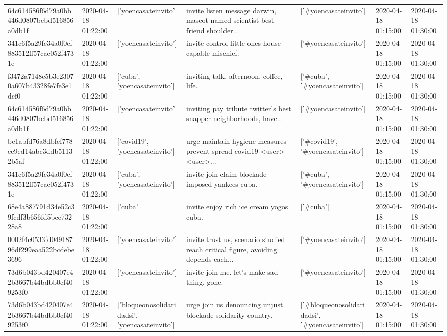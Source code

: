 \begin{tabular}{lllllll}
64c614586f6d79a0bb446d0807bebd516856a0db1f & 2020-04-18 01:22:00 & ['yoencasateinvito'] & invite listen message darwin, mascot named scientist best friend shoulder... & ['#yoencasateinvito'] & 2020-04-18 01:15:00 & 2020-04-18 01:30:00 \\
341c6f5a29fc34a0f0cf883512ff57cae052f4731e & 2020-04-18 01:22:00 & ['yoencasateinvito'] & invite control little ones house capable mischief. & ['#yoencasateinvito'] & 2020-04-18 01:15:00 & 2020-04-18 01:30:00 \\
f3472a7148c5b3e23070a607b43328fe7fe3e1dcf0 & 2020-04-18 01:22:00 & ['cuba', 'yoencasateinvito'] & inviting talk, afternoon, coffee, life. & ['#cuba', '#yoencasateinvito'] & 2020-04-18 01:15:00 & 2020-04-18 01:30:00 \\
64c614586f6d79a0bb446d0807bebd516856a0db1f & 2020-04-18 01:22:00 & ['yoencasateinvito'] & inviting pay tribute twitter's best snapper neighborhoods, have... & ['#yoencasateinvito'] & 2020-04-18 01:15:00 & 2020-04-18 01:30:00 \\
bc1abfd76a8dbfef778ee9ed14abc3ddb51132b5af & 2020-04-18 01:22:00 & ['covid19', 'yoencasateinvito'] & urge maintain hygiene measures prevent spread covid19 <user> <user>... & ['#covid19', '#yoencasateinvito'] & 2020-04-18 01:15:00 & 2020-04-18 01:30:00 \\
341c6f5a29fc34a0f0cf883512ff57cae052f4731e & 2020-04-18 01:22:00 & ['cuba', 'yoencasateinvito'] & invite join claim blockade imposed yankees cuba. & ['#cuba', '#yoencasateinvito'] & 2020-04-18 01:15:00 & 2020-04-18 01:30:00 \\
68e4a887791d34e52c39fcdf3b656fd5bce73228a8 & 2020-04-18 01:22:00 & ['cuba'] & invite enjoy rich ice cream yogos cuba. & ['#cuba'] & 2020-04-18 01:15:00 & 2020-04-18 01:30:00 \\
0002f4c0533fd04918796df299eaa522bcdebe3696 & 2020-04-18 01:22:00 & ['yoencasateinvito'] & invite trust us, scenario studied reach critical figure, avoiding depends each... & ['#yoencasateinvito'] & 2020-04-18 01:15:00 & 2020-04-18 01:30:00 \\
73d6b043bd420407e42b3667b44bdbb0cf409253f0 & 2020-04-18 01:22:00 & ['yoencasateinvito'] & invite join me. let's make sad thing. gone. & ['#yoencasateinvito'] & 2020-04-18 01:15:00 & 2020-04-18 01:30:00 \\
73d6b043bd420407e42b3667b44bdbb0cf409253f0 & 2020-04-18 01:22:00 & ['bloqueonosolidaridadsi', 'yoencasateinvito'] & urge join us denouncing unjust blockade solidarity country. & ['#bloqueonosolidaridadsi', '#yoencasateinvito'] & 2020-04-18 01:15:00 & 2020-04-18 01:30:00 \\

\end{tabular}
